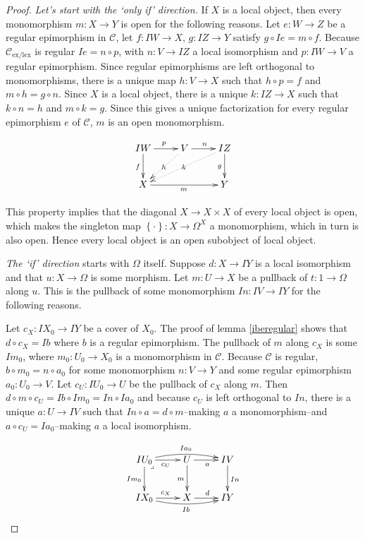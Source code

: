\documentclass[sort&compress]{elsarticle}
\theoremstyle{plain}
\theoremstyle{definition}
\theoremstyle{remark}
\newcommand\cat\mathcal
\newcommand\set[1]{\left\{#1\right\}}
\newcommand\exlex{_\mathrm{ex/lex}}
\begin{document}
\begin{proof} \emph{Let's start with the `only if' direction.} If $X$ is a local object, then every monomorphism $m:X\to Y$ is open for the following reasons. Let $e:W\to Z$ be a regular epimorphism in $\cat C$, let $f:IW\to X$, $g:IZ\to Y$ satisfy $g\circ Ie = m\circ f$. Because $\cat C\exlex$ is regular $Ie = n\circ p$, with $n:V\to IZ$ a local isomorphism and $p:IW\to V$ a regular epimorphism. 
Since regular epimorphisms are left orthogonal to monomorphisms, there is a unique map $h:V\to X$ such that $h\circ p = f$ and $m\circ h = g\circ n$. Since $X$ is a local object, there is a unique $k:IZ\to X$ such that $k\circ n = h$ and $m\circ k = g$. Since this gives a unique factorization for every regular epimorphism $e$ of $\cat C$, $m$ is an open monomorphism.

\[ \xymatrix{
IW \ar[r]^p \ar[d]_{f}  & V \ar[r]^n\ar@{.>}[dl]|h & IZ \ar[d]_g\ar@{.>}[dll]|k \\
X \ar[rr]_m && Y
}\]

This property implies that the diagonal $X\to X\times X$ of every local object is open, which makes the singleton map $\set\cdot:X\to \Omega^X$ a monomorphism, which in turn is also open. Hence every local object is an open subobject of local object.


\emph{The `if' direction} starts with $\Omega$ itself. Suppose $d:X\to IY$ is a local isomorphism and that $u:X\to \Omega$ is some morphism. Let $m: U\to X$ be a pullback of $t:1\to \Omega$ along $u$. This is the pullback of some monomorphism $In:IV \to IY$ for the following reasons.

Let $c_X:IX_0 \to IY$ be a cover of $X_0$. The proof of lemma \ref{iberegular} shows that $d\circ c_X = Ib$ where $b$ is a regular epimorphism.
The pullback of $m$ along $c_X$ is some $Im_0$, where $m_0:U_0 \to X_0$ is a monomorphism in $\cat C$. Because $\cat C$ is regular, $b\circ m_0 = n\circ a_0$ for some monomorphism $n:V\to Y$ and some regular epimorphism $a_0:U_0\to V$. Let $c_U: IU_0\to U$ be the pullback of $c_X$ along $m$. Then $d\circ m\circ c_U = Ib\circ Im_0 = In\circ Ia_0$ and because $c_U$ is left orthogonal to $In$, there is a unique $a:U\to IV$ such that $In \circ a = d\circ m$--making $a$ a monomorphism--and $a\circ c_U = Ia_0$--making $a$ a local isomorphism.

\[\xymatrix{
IU_0 \ar[d]_{Im_0} \ar[r]_{c_U} \ar@/^/[rr]^{Ia_0}\ar@{}[dr]|<\lrcorner & U \ar[r]_a \ar[d]_{m} & IV \ar[d]^{In}\\
IX_0 \ar[r]^{c_X} \ar@/_/[rr]_{Ib} & X \ar[r]^d & IY
}\]


\end{proof}
\end{document}

